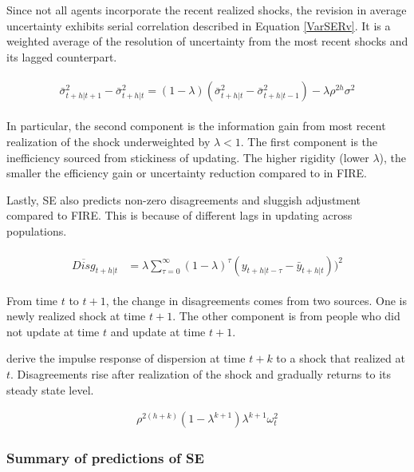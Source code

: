 \documentclass[]{article}
\begin{document}
	
	Since not all agents incorporate the recent realized shocks, the revision in average uncertainty exhibits serial correlation described in Equation \ref{VarSERv}. It is a weighted average of the resolution of uncertainty from the most recent shocks and its lagged counterpart. 
	
	\begin{eqnarray}\label{VarSERv}
		\begin{aligned}
			\bar \sigma^2_{t+h|t+1} - \bar \sigma^2_{t+h|t} = (1-\lambda)(
			\bar \sigma^2_{t+h|t} - \bar \sigma^2_{t+h|t-1}) -\lambda \rho^{2h} \sigma^2 
		\end{aligned}
	\end{eqnarray}
	
	In particular, the second component is the information gain from most recent realization of the shock underweighted by $\lambda<1$. The first component is the inefficiency sourced from stickiness of updating. The higher rigidity (lower $\lambda$), the smaller the efficiency gain or uncertainty reduction compared to in FIRE. 
	
	Lastly, SE also predicts non-zero disagreements and sluggish adjustment compared to FIRE. This is because of different lags in updating across populations. 
	
	\begin{eqnarray}\label{DisgSEPop}
		\begin{aligned}
			\overline{Disg}_{t+h|t} & = \lambda \sum^{\infty}_{\tau=0} (1-\lambda)^{\tau} (y_{t+h|t-\tau} - \bar y_{t+h|t }))^2  
		\end{aligned}
	\end{eqnarray}
	
	From time $t$ to $t+1$, the change in disagreements comes from two sources. One is newly realized shock at time $t+1$. The other component is from people who did not update at time $t$ and update at time $t+1$.  
	
	\citet{coibion2012can} derive the impulse response of dispersion at time $t+k$ to a shock that realized at $t$. Disagreements rise after realization of the shock and gradually returns to its steady state level.  
	
	\begin{eqnarray}
		\rho^{2(h+k)} (1-\lambda^{k+1})\lambda^{k+1} \omega^2_t
	\end{eqnarray}
	
	
	
	\subsubsection{Summary of predictions of SE}
	
\end{document}

